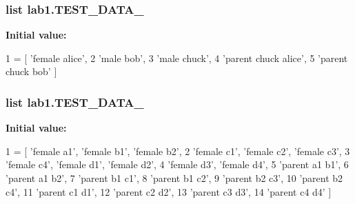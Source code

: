 \subsubsection[{T\+E\+S\+T\+\_\+\+D\+A\+T\+A\+\_\+1}]{\setlength{\rightskip}{0pt plus 5cm}list lab1.\+T\+E\+S\+T\+\_\+\+D\+A\+T\+A\+\_}\label{namespacelab1_aed2d020dbfee204727220a36741309e5}
{\bfseries Initial value\+:}
\begin{DoxyCode}
1 = [ \textcolor{stringliteral}{'female alice'},
2                 \textcolor{stringliteral}{'male bob'},
3                 \textcolor{stringliteral}{'male chuck'},
4                 \textcolor{stringliteral}{'parent chuck alice'},
5                 \textcolor{stringliteral}{'parent chuck bob'} ]
\end{DoxyCode}
\hypertarget{namespacelab1_a126ca68dba8f47fc90c7863daf3e1ce2}{}
\subsubsection[{T\+E\+S\+T\+\_\+\+D\+A\+T\+A\+\_\+2}]{\setlength{\rightskip}{0pt plus 5cm}list lab1.\+T\+E\+S\+T\+\_\+\+D\+A\+T\+A\+\_}\label{namespacelab1_a126ca68dba8f47fc90c7863daf3e1ce2}
{\bfseries Initial value\+:}
\begin{DoxyCode}
1 = [ \textcolor{stringliteral}{'female a1'}, \textcolor{stringliteral}{'female b1'}, \textcolor{stringliteral}{'female b2'}, 
2                 \textcolor{stringliteral}{'female c1'}, \textcolor{stringliteral}{'female c2'}, \textcolor{stringliteral}{'female c3'}, 
3                 \textcolor{stringliteral}{'female c4'}, \textcolor{stringliteral}{'female d1'}, \textcolor{stringliteral}{'female d2'}, 
4                 \textcolor{stringliteral}{'female d3'}, \textcolor{stringliteral}{'female d4'},
5                 \textcolor{stringliteral}{'parent a1 b1'},
6                 \textcolor{stringliteral}{'parent a1 b2'},
7                 \textcolor{stringliteral}{'parent b1 c1'},
8                 \textcolor{stringliteral}{'parent b1 c2'},
9                 \textcolor{stringliteral}{'parent b2 c3'},
10                 \textcolor{stringliteral}{'parent b2 c4'},
11                 \textcolor{stringliteral}{'parent c1 d1'},
12                 \textcolor{stringliteral}{'parent c2 d2'},
13                 \textcolor{stringliteral}{'parent c3 d3'},
14                 \textcolor{stringliteral}{'parent c4 d4'} ]
\end{DoxyCode}
\hypertarget{namespacelab1_a12138b8a907a9039b6a801459bef9663}{}
